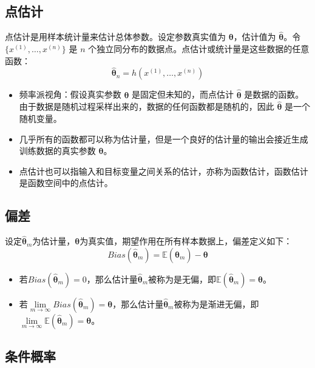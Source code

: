 \documentclass[cn,11pt,chinese,blue,bibstyle=ieeetr]{elegantbook}
\begin{document}
{\subsection{点估计}

点估计是用样本统计量来估计总体参数。设定参数真实值为 $\bm{\theta}$，估计值为 $\bm{\widehat{\theta}}$。令 $\{ x^{(1)} , \dots , x^{(n)} \}$ 是 $n$ 个独立同分布的数据点。点估计或统计量是这些数据的任意函数：
\begin{equation}
\bm{\widehat{\theta}}_n = h(x^{(1)}, \dots , x^{(n)})
\end{equation}

\begin{itemize}
\item 频率派视角：假设真实参数 $\bm{\theta}$ 是固定但未知的，而点估计 $\bm{\widehat{\theta}}$ 是数据的函数。由于数据是随机过程采样出来的，数据的任何函数都是随机的，因此 $\bm{\widehat{\theta}}$ 是一个随机变量。
\item 几乎所有的函数都可以称为估计量，但是一个良好的估计量的输出会接近生成训练数据的真实参数 $\bm{\theta}$。
\item 点估计也可以指输入和目标变量之间关系的估计，亦称为函数估计，函数估计是函数空间中的点估计。
\end{itemize}


\subsection{偏差}

设定$\bm{\widehat{\theta}}_m$为估计量，$\bm{\theta}$为真实值，期望作用在所有样本数据上，偏差定义如下：
\begin{equation}
Bias(\bm{\widehat{\theta}}_m) = \mathbb{E}(\bm{\widehat{\theta}}_m) - \bm{\theta}
\end{equation}

\begin{itemize}
\item 若$Bias(\bm{\widehat{\theta}}_m) = 0$，那么估计量$\bm{\widehat{\theta}}_m$被称为是无偏，即$\mathbb{E}(\bm{\widehat{\theta}}_m)=\bm{\theta}$。
\item 若$\lim \limits_{m \to \infty} Bias(\bm{\widehat{\theta}}_m)=\bm{\theta}$，那么估计量$\bm{\widehat{\theta}}_m$被称为是渐进无偏，即$\lim \limits_{m \to \infty} \mathbb{E}(\bm{\widehat{\theta}}_m)=\bm{\theta}$。
\end{itemize}


\subsection{条件概率}

}
\end{document}
